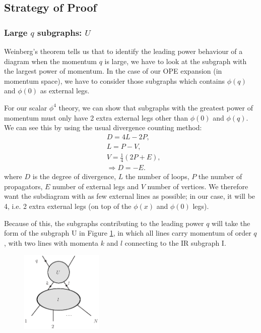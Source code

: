 \documentclass{article}
\begin{document}
\subsection{Strategy of Proof}
\subsubsection{Large $q$ subgraphs: $U$}
Weinberg's theorem tells us that to identify the leading power behaviour of a diagram when the momentum $q$ is large, we have to look at the subgraph with the largest power of momentum. In the case of our OPE expansion (in momentum space), we have to consider those subgraphs which contains $\phi(q)$ and $\phi(0)$ as external legs. 

For our scalar $\phi^4$ theory, we can show that subgraphs with the greatest power of momentum must only have 2 extra external legs other than $\phi(0)$ and $\phi(q)$. We can see this by using the usual divergence counting method:
\begin{equation}
\begin{split}
    &D=4L-2P,\\
    &L=P-V,\\
    &V=\frac{1}{4}(2P+E),\\
    &\Rightarrow D=-E.
\end{split}
\end{equation}
where $D$ is the degree of divergence, $L$ the number of loops, $P$ the number of propagators, $E$ number of external legs and $V$ number of vertices. We therefore want the subdiagram with as few external lines as possible; in our case, it will be 4, i.e. 2 extra external legs (on top of the $\phi(x)$ and $\phi(0)$ legs). 

Because of this, the subgraphs contributing to the leading power $q$ will take the form of the subgraph U in Figure \ref{fig:10.2.1}, in which all lines carry momentum of order $q$, with two lines with momenta $k$ and $l$ connecting to the IR subgraph I. 

\begin{figure}[H]
\centering
\includegraphics[width=0.35\textwidth]{Graphs/fig1021.eps} 
\caption{}
\label{fig:10.2.1}
\end{figure}
\end{document}
